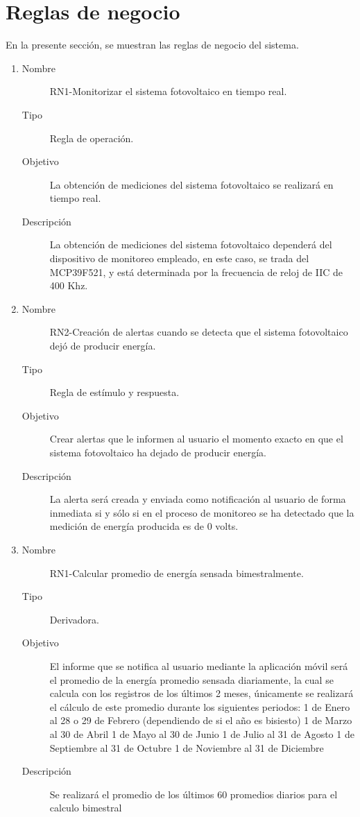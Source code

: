 \section{Reglas de negocio}
En la presente sección, se muestran las reglas de negocio del sistema.
\begin{enumerate}[label=RN\arabic*.]
    \item \label{RN1}
		\begin{description}
			\item[Nombre] RN1-Monitorizar el sistema fotovoltaico en tiempo real.
			\item[Tipo] Regla de operación.
			\item[Objetivo] La obtención de mediciones del sistema fotovoltaico se realizará en tiempo real.
			\item[Descripción] La obtención de mediciones del sistema fotovoltaico dependerá del dispositivo de monitoreo empleado, en este caso, se trada del MCP39F521, y está determinada por la frecuencia de reloj de IIC de 400 Khz. 
    		\end{description}
    		
    \item \label{RN2}
		\begin{description}
			\item[Nombre] RN2-Creación de alertas cuando se detecta que el sistema fotovoltaico dejó de producir energía.
			\item[Tipo] Regla de estímulo y respuesta.
			\item[Objetivo] Crear alertas que le informen al usuario el momento exacto en que el sistema fotovoltaico ha dejado de producir energía.
			\item[Descripción] La alerta será creada y enviada como notificación al usuario de forma inmediata si y sólo si en el proceso de monitoreo se ha detectado que la medición de energía producida es de 0 volts.  
    		\end{description}
\item \label{RN3}
		\begin{description}
			\item[Nombre] RN1-Calcular promedio de energía sensada bimestralmente.
			\item[Tipo] Derivadora.
			\item[Objetivo] El informe que se notifica al usuario mediante la aplicación móvil será el promedio de la energía promedio sensada diariamente, la cual se calcula con los registros de los últimos 2 meses, únicamente se realizará el cálculo de este promedio durante los siguientes periodos:
				1 de Enero al 28 o 29 de Febrero (dependiendo de si el año es bisiesto)
				1 de Marzo al 30 de Abril
				1 de Mayo al 30 de Junio
				1 de Julio al 31 de Agosto
				1 de Septiembre al 31 de Octubre
				1 de Noviembre al 31 de Diciembre
			\item[Descripción] Se realizará el promedio de los últimos 60 promedios diarios para el calculo bimestral
		\end{description}


\end{enumerate}
